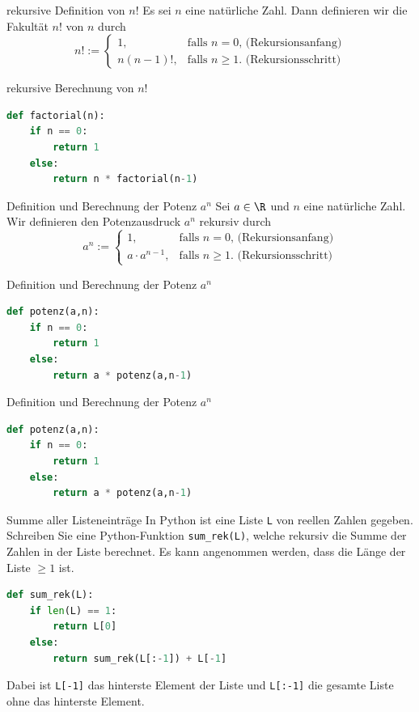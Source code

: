 \begin{frame}[fragile]{rekursive Definition von $n!$}
Es sei $n$ eine natürliche Zahl. Dann definieren wir die Fakultät $n!$ von $n$ durch
\[
  n! := 
  \begin{cases}
    1, &\text{falls $n=0$, (Rekursionsanfang)} \\
    n(n-1)!, & \text{falls  $n\geq 1$. (Rekursionsschritt)}
  \end{cases}
\]
\end{frame}

\begin{frame}[fragile]{rekursive Berechnung von $n!$}
\begin{lstlisting}[language=Python]
def factorial(n):
    if n == 0:
        return 1
    else:
        return n * factorial(n-1)
\end{lstlisting}
\end{frame}

\begin{frame}[fragile]{Definition und Berechnung der Potenz $a^n$}
Sei $a\in\R$ und $n$ eine natürliche Zahl. Wir definieren den Potenzausdruck $a^n$ rekursiv durch
\[
  a^n := 
  \begin{cases}
    1, &\text{falls $n=0$, (Rekursionsanfang)} \\
    a\cdot a^{n-1}, & \text{falls  $n\geq 1$. (Rekursionsschritt)}
  \end{cases}
\]
\end{frame}

\begin{frame}[fragile]{Definition und Berechnung der Potenz $a^n$}
\begin{lstlisting}[language=Python]
def potenz(a,n):
    if n == 0:
        return 1
    else:
        return a * potenz(a,n-1)
\end{lstlisting}
\end{frame}

\begin{frame}[fragile]{Definition und Berechnung der Potenz $a^n$}
\begin{lstlisting}[language=Python]
def potenz(a,n):
    if n == 0:
        return 1
    else:
        return a * potenz(a,n-1)
\end{lstlisting}
\end{frame}


\begin{frame}[fragile]{Summe aller Listeneinträge}
In Python ist eine Liste \lstinline|L| von reellen Zahlen gegeben. Schreiben Sie eine Python-Funktion \lstinline|sum_rek(L)|, welche rekursiv die Summe der Zahlen in der Liste berechnet. Es kann angenommen werden, dass die Länge der Liste $\geq 1$ ist.
\begin{lstlisting}[language=Python]
def sum_rek(L):
    if len(L) == 1:
        return L[0]
    else:
        return sum_rek(L[:-1]) + L[-1]
\end{lstlisting}
Dabei ist \lstinline|L[-1]| das hinterste Element der Liste und \lstinline|L[:-1]| die gesamte Liste ohne das hinterste Element.
\end{frame}



